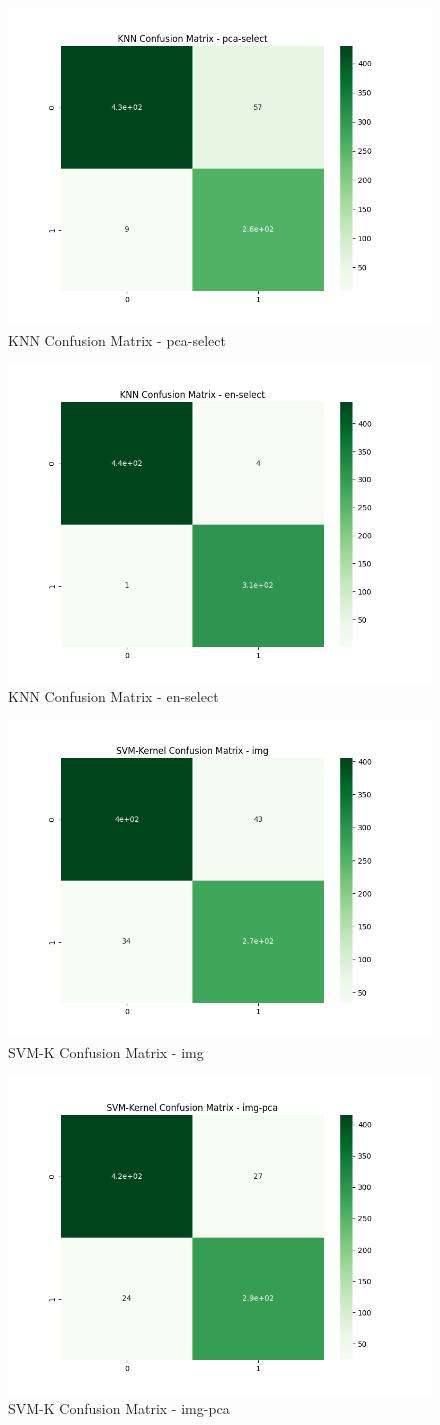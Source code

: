 \documentclass{article}
\begin{document}
\begin{multicols}{2}
\begin{figure}[H]
    \centering
    \includegraphics[width = .48\textwidth]{confusion/knn-confusion-pca-select.png}
    \caption{KNN Confusion Matrix - pca-select}
    \label{fig:enter-label}
\end{figure}

\begin{figure}[H]
    \centering
    \includegraphics[width = .48\textwidth]{confusion/knn-confusion-en-select.png}
    \caption{KNN Confusion Matrix - en-select}
    \label{fig:enter-label}
\end{figure}

\begin{figure}[H]
    \centering
    \includegraphics[width = .48\textwidth]{confusion/svmK-confusion-img.png}
    \caption{SVM-K Confusion Matrix - img}
    \label{fig:enter-label}
\end{figure}

\begin{figure}[H]
    \centering
    \includegraphics[width = .48\textwidth]{confusion/svmK-confusion-img-pca.png}
    \caption{SVM-K Confusion Matrix - img-pca}
    \label{fig:enter-label}
\end{figure}


\end{multicols}
\end{document}
